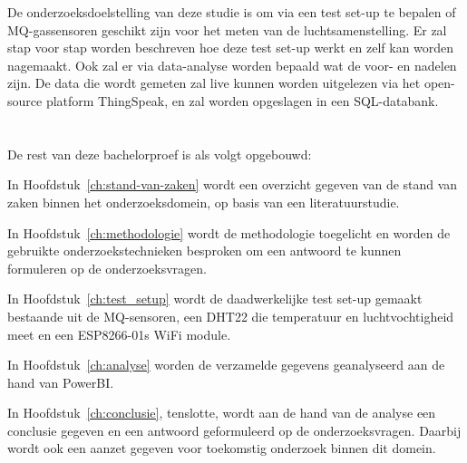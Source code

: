 De onderzoeksdoelstelling van deze studie is om via een test set-up te bepalen of MQ-gassensoren geschikt zijn voor het meten van de luchtsamenstelling. Er zal stap voor stap worden beschreven hoe deze test set-up werkt en zelf kan worden nagemaakt. Ook zal er via data-analyse worden bepaald wat de voor- en nadelen zijn. De data die wordt gemeten zal live kunnen worden uitgelezen via het open-source platform ThingSpeak, en zal worden opgeslagen in een SQL-databank.



\section{}%
\label{sec:opzet-bachelorproef}


De rest van deze bachelorproef is als volgt opgebouwd:

In Hoofdstuk~\ref{ch:stand-van-zaken} wordt een overzicht gegeven van de stand van zaken binnen het onderzoeksdomein, op basis van een literatuurstudie.

In Hoofdstuk~\ref{ch:methodologie} wordt de methodologie toegelicht en worden de gebruikte onderzoekstechnieken besproken om een antwoord te kunnen formuleren op de onderzoeksvragen.


In Hoofdstuk~\ref{ch:test_setup} wordt de daadwerkelijke test set-up gemaakt bestaande uit de MQ-sensoren, een DHT22 die temperatuur en luchtvochtigheid meet en een ESP8266-01s WiFi module.

In Hoofdstuk~\ref{ch:analyse} worden de verzamelde gegevens geanalyseerd aan de hand van PowerBI.


In Hoofdstuk~\ref{ch:conclusie}, tenslotte, wordt aan de hand van de analyse een conclusie gegeven en een antwoord geformuleerd op de onderzoeksvragen. Daarbij wordt ook een aanzet gegeven voor toekomstig onderzoek binnen dit domein.